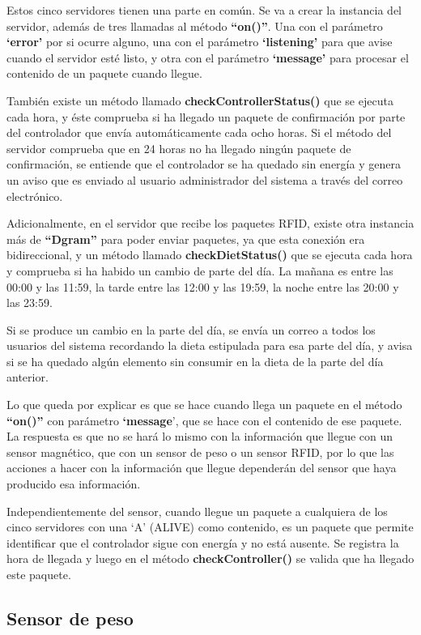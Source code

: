 Estos cinco servidores tienen una parte en común. Se va a crear la instancia del servidor, además de tres llamadas al método \textbf{“on()”}. Una con el parámetro \textbf{‘error’} por si ocurre alguno, una con el parámetro \textbf{‘listening’} para que avise cuando el servidor esté listo, y otra con el parámetro \textbf{‘message’} para procesar el contenido de un paquete cuando llegue.

También existe un método llamado \textbf{checkControllerStatus()} que se ejecuta cada hora, y éste comprueba si ha llegado un paquete de confirmación por parte del controlador que envía automáticamente cada ocho horas. Si el método del servidor comprueba que en 24 horas no ha llegado ningún paquete de confirmación, se entiende que el controlador se ha quedado sin energía y genera un aviso que es enviado al usuario administrador del sistema a través del correo electrónico.

Adicionalmente, en el servidor que recibe los paquetes RFID, existe otra instancia más de \textbf{“Dgram”} para poder enviar paquetes, ya que esta conexión era bidireccional, y un método llamado \textbf{checkDietStatus()} que se ejecuta cada hora y comprueba si ha habido un cambio de parte del día. La mañana es entre las 00:00 y las 11:59, la tarde entre las 12:00 y las 19:59, la noche entre las 20:00 y las 23:59.

Si se produce un cambio en la parte del día, se envía un correo a todos los usuarios del sistema recordando la dieta estipulada para esa parte del día, y avisa si se ha quedado algún elemento sin consumir en la dieta de la parte del día anterior.

Lo que queda por explicar es que se hace cuando llega un paquete en el método \textbf{“on()”} con parámetro \textbf{‘message}’, que se hace con el contenido de ese paquete. La respuesta es que no se hará lo mismo con la información que llegue con un sensor magnético, que con un sensor de peso o un sensor RFID, por lo que las acciones a hacer con la información que llegue dependerán del sensor que haya producido esa información.


Independientemente del sensor, cuando llegue un paquete a cualquiera de los cinco servidores con una ‘A’ (ALIVE) como contenido, es un paquete que permite identificar que el controlador sigue con energía y no está ausente. Se registra la hora de llegada y luego en el método \textbf{checkController()} se valida que ha llegado este paquete.

\subsection{Sensor de peso}


